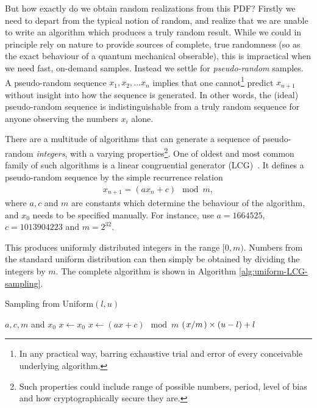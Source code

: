 \documentclass[Thesis.tex]{subfiles}
\begin{document}
But how exactly do we obtain random realizations from this PDF? Firstly we need
to depart from the typical notion of random, and realize that we are unable to
write an algorithm which produces a truly random result. While we could in
principle rely on nature to provide sources of complete, true randomness (so as
the exact behaviour of a quantum mechanical obserable), this is impractical
when we need fast, on-demand samples. Instead we settle for
\emph{pseudo-random} samples. A pseudo-random sequence $x_1, x_2,\dots x_n$
implies that one cannot\footnote{In any practical way, barring exhaustive trial
and error of every conceivable underlying algorithm.} predict $x_{n+1}$ without
insight into how the sequence is generated. In other words, the (ideal)
pseudo-random sequence is indistinguishable from a truly random sequence for
anyone observing the numbers $x_i$ alone.

There are a multitude of algorithms that can generate a sequence of
pseudo-random \emph{integers}, with a varying properties\footnote{Such properties
could include range of possible numbers, period, level of bias and how
cryptographically secure they are.}. One of oldest and most common family of
such algorithms is a linear congruential generator (LCG)~\cite{Knuth-1997-ACP-270146}. It defines a pseudo-random sequence by the simple recurrence relation
\begin{align}
    \label{eq:linear-congruential-generator-relation}
    x_{n+1} = (ax_n + c)\mod m,
\end{align}
where $a, c$ and $m$ are constants which determine the behaviour of the
algorithm, and $x_0$ needs to be specified manually. For instance,
\textcite{Numerical-Recipes-Press-et-al} use $a = 1664525$, $c=1013904223$ and
$m=2^{32}$.

This produces uniformly distributed integers in the range $[0, m)$. Numbers
from the standard uniform distribution can then simply be obtained by dividing
the integers by $m$. The complete algorithm is shown in Algorithm \autoref{alg:uniform-LCG-sampling}.

\begin{algorithm}[h]
    \caption{Sampling from $\text{Uniform}(l, u)$}
    \label{alg:uniform-LCG-sampling}
    \begin{algorithmic}[1]
        \Require $a, c, m$ and $x_0$
            \State $x\gets x_0$
            \Repeat
                \State $x\gets (ax + c)\mod m$
                \State \Yield $(\flatfrac{x}{m}) \times (u - l) + l$
        \EndFunction
    \end{algorithmic}
\end{algorithm}
\end{document}

